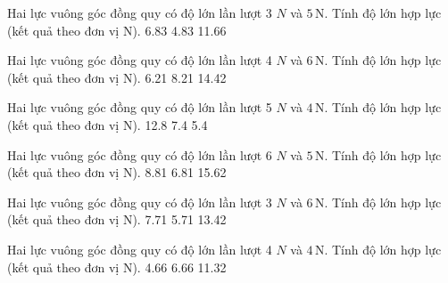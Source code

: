 \begin{ex}
Hai lực vuông góc đồng quy có độ lớn lần lượt 3 $N$ và $5\,\text{N}$. Tính độ lớn hợp lực (kết quả theo đơn vị N).
\choice
{6.83}
{}
{4.83}
{11.66}
\end{ex}

\begin{ex}
Hai lực vuông góc đồng quy có độ lớn lần lượt 4 $N$ và $6\,\text{N}$. Tính độ lớn hợp lực (kết quả theo đơn vị N).
\choice
{6.21}
{8.21}
{}
{14.42}
\end{ex}

\begin{ex}
Hai lực vuông góc đồng quy có độ lớn lần lượt 5 $N$ và $4\,\text{N}$. Tính độ lớn hợp lực (kết quả theo đơn vị N).
\choice
{12.8}
{7.4}
{5.4}
{}
\end{ex}

\begin{ex}
Hai lực vuông góc đồng quy có độ lớn lần lượt 6 $N$ và $5\,\text{N}$. Tính độ lớn hợp lực (kết quả theo đơn vị N).
\choice
{}
{8.81}
{6.81}
{15.62}
\end{ex}

\begin{ex}
Hai lực vuông góc đồng quy có độ lớn lần lượt 3 $N$ và $6\,\text{N}$. Tính độ lớn hợp lực (kết quả theo đơn vị N).
\choice
{7.71}
{}
{5.71}
{13.42}
\end{ex}

\begin{ex}
Hai lực vuông góc đồng quy có độ lớn lần lượt 4 $N$ và $4\,\text{N}$. Tính độ lớn hợp lực (kết quả theo đơn vị N).
\choice
{4.66}
{6.66}
{}
{11.32}
\end{ex}

